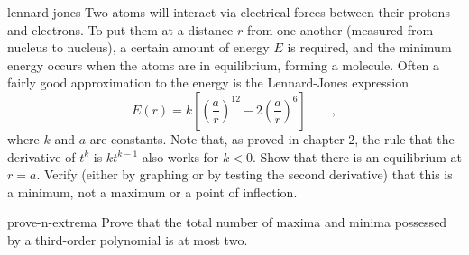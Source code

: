 \begin{hwsection}
\begin{hwwithsoln}{lennard-jones}
Two atoms will interact via electrical forces between
their protons and electrons. To put them at a distance $r$ from one another (measured from
nucleus to nucleus), a certain amount of energy $E$ is required, and the minimum energy
occurs when the atoms are in equilibrium, forming a molecule. Often a fairly good approximation
to the energy is the Lennard-Jones expression
\begin{equation*}
  E(r) = k\left[\left(\frac{a}{r}\right)^{12}-2\left(\frac{a}{r}\right)^6\right] \qquad ,
\end{equation*}
where $k$ and $a$ are constants. Note that, as proved in chapter 2, the rule that
the derivative of $t^k$ is $kt^{k-1}$ also works for $k<0$.
Show that there is an equilibrium at $r=a$. Verify (either by graphing or by testing
the second derivative) that this is a minimum, not a maximum or a point of inflection.
\end{hwwithsoln}

\begin{hwwithsoln}{prove-n-extrema}
Prove that the total number of maxima and minima possessed by a third-order polynomial
is at most two.
\end{hwwithsoln}

\end{hwsection}
